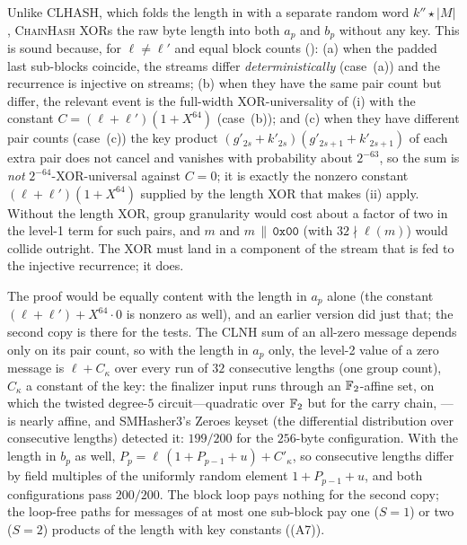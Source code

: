 \begin{remark}\label{rem:ph:length}
Unlike CLHASH, which folds the length in with a separate random word
$k''\star|M|$ \cite[Alg.~4]{lemire2015clhash}, \textsc{ChainHash} XORs the
raw byte length into both $a_p$ and $b_p$ without any key.  This is sound because, for
$\ell\ne\ell'$ and equal block counts ():
(a) when the padded last sub-blocks coincide, the streams differ
\emph{deterministically} (case~(a)) and the recurrence is injective on streams;
(b) when they have the same pair count but differ, the relevant event is the
full-width XOR-universality of (i) with the constant
$C=(\ell+\ell')(1+X^{64})$ (case~(b)); and
(c) when they have different pair counts (case~(c)) the key product
$(g'_{2s}+k'_{2s})(g'_{2s+1}+k'_{2s+1})$ of each extra pair does not cancel and
vanishes with probability about $2^{-63}$, so the sum is \emph{not}
$2^{-64}$-XOR-universal against $C=0$; it is exactly the nonzero constant
$(\ell+\ell')(1+X^{64})$ supplied by the length XOR that makes (ii)
apply.  Without the length XOR, group granularity would cost about a factor
of two in the level-1 term for such pairs, and $m$ and $m\,\|\,\texttt{0x00}$
(with $32\nmid\ell(m)$) would collide outright.  The XOR must land in a
component of the stream that is fed to the injective recurrence; it does.

The proof would be equally content with the length in $a_p$ alone (the
constant $(\ell+\ell')+X^{64}\cdot0$ is nonzero as well), and an earlier
version did just that; the second copy is there for the tests.  The CLNH
sum of an all-zero message depends only on its pair count, so with the
length in $a_p$ only, the level-2 value of a zero message is $\ell+C_\kappa$
over every run of $32$ consecutive lengths (one group count), $C_\kappa$ a
constant of the key: the finalizer input runs through an $\mathbb{F}_2$-affine set,
on which the twisted degree-$5$ circuit---quadratic over $\mathbb{F}_2$ but for the
carry chain, ---is nearly affine, and SMHasher3's Zeroes
keyset (the differential distribution over consecutive lengths) detected
it: $199/200$ for the $256$-byte configuration.  With the length in $b_p$
as well, $P_p=\ell\,(1+P_{p-1}+u)+C'_\kappa$, so consecutive lengths differ
by field multiples of the uniformly random element $1+P_{p-1}+u$, and both
configurations pass $200/200$.  The block loop pays nothing for the second
copy; the loop-free paths for messages of at most one sub-block pay one
($S=1$) or two ($S=2$) products of the length with key constants
((A7)).
\end{remark}

